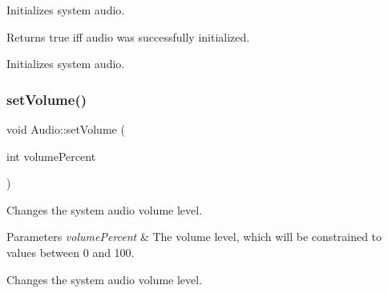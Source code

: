 Initializes system audio.

\begin{DoxyReturn}{Returns}
true iff audio was successfully initialized.
\end{DoxyReturn}
Initializes system audio. \mbox{\label{namespaceAudio_af70e115ed53babcf2c418cbd1cd50bba}} 
\subsubsection{\texorpdfstring{set\+Volume()}{setVolume()}}
{\footnotesize\ttfamily void Audio\+::set\+Volume (\begin{DoxyParamCaption}\item[{int}]{volume\+Percent }\end{DoxyParamCaption})}

Changes the system audio volume level.


\begin{DoxyParams}{Parameters}
{\em volume\+Percent} & The volume level, which will be constrained to values between 0 and 100.\\
\hline
\end{DoxyParams}
Changes the system audio volume level. 